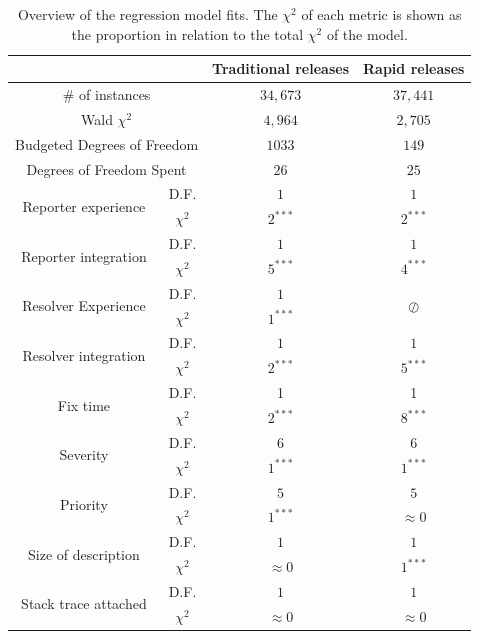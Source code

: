 \begin{sloppypar}
\begin{table}[t]
	\scriptsize
	\begin{center}
		\caption{Overview of the regression model fits. The $\chi^2$ of
		each metric is shown as the proportion in relation to the total
	$\chi^2$ of the model.  \label{tbl:regression_models} }
			\begin{tabular}{cccc}
			\cline{3-4} 
			\multicolumn{2}{c}{} & 
			Traditional releases &
			Rapid releases 
			\tabularnewline
			\hline 
			\multicolumn{2}{c}{\# of instances} & 
			$34,673$ &
			$37,441$  
			\tabularnewline
			\hline
			\multicolumn{2}{c}{Wald $\chi^2$} & 
			$4,964$ &
			$2,705$  
			\tabularnewline
			\hline 
			\multicolumn{2}{c}{Budgeted Degrees of Freedom} &
			$1033$ & 
			$149$ 
			\tabularnewline
			\hline
			\multicolumn{2}{c}{Degrees of Freedom Spent} &
			$26$ & 
			$25$ 
			\tabularnewline
			\hline 
			\multirow{2}{*}{Reporter experience} & 
			D.F. & 
			$1$ & 
			$1$  
			\tabularnewline 
			& 
			$\chi^2$ & 
			$2^{\ast\ast\ast}$ &  
			$2^{\ast\ast\ast}$ 
			\tabularnewline
			\hline 
			\multirow{2}{*}{Reporter integration} & 
			D.F. & 
			$1$ & 
			$1$  
			\tabularnewline 
			& 
			$\chi^2$ & 
			$5^{\ast\ast\ast}$ &  
			$4^{\ast\ast\ast}$ 
			\tabularnewline
			\hline 
			\multirow{2}{*}{Resolver Experience} & 
			D.F. & 
			$1$ & 
			\multirow{2}{*}{$\oslash$}
			\tabularnewline &
			$\chi^2$ & 
			$1^{\ast\ast\ast}$ &
			\tabularnewline 
			\hline 
			\multirow{2}{*}{Resolver integration} & 
			D.F. & 
			$1$ & 
			$1$  
			\tabularnewline 
			& 
			$\chi^2$ & 
			$2^{\ast\ast\ast}$ &  
			$5^{\ast\ast\ast}$ 
			\tabularnewline
			\hline 
			\multirow{2}{*}{Fix time} & 
			D.F. & 
			1 &
			1  
			\tabularnewline & 
			$\chi^2$ &
			$2^{\ast\ast\ast}$ &
			$8^{\ast\ast\ast}$ 
			\tabularnewline \hline 
			\multirow{2}{*}{Severity} &
			D.F. & 
			$6$ & 
			$6$ 
			\tabularnewline & 
			$\chi^2$ & 
			$1^{\ast\ast\ast}$ &  
			$1^{\ast\ast\ast}$  
			\tabularnewline \hline 
			\multirow{2}{*}{Priority} & 
			D.F. & 
			$5$ & 
			$5$ 
			\tabularnewline & 
			$\chi^2$ & 
			$1^{\ast\ast\ast}$ &  
			$\approx 0$   
			\tabularnewline \hline 
			\multirow{2}{*}{Size of description} & 
			D.F. & 
			$1$ &
			$1$  
			\tabularnewline & 
			$\chi^2$ & 
			$\approx 0$ &
			$1^{\ast\ast\ast}$   
			\tabularnewline \hline 
			\multirow{2}{*}{Stack trace attached} & 
			D.F. & 
			$1$ &
			$1$  
			\tabularnewline & 
			$\chi^2$ & 
			$\approx 0$ &  
			$\approx 0$ 
			\tabularnewline \hline 

\end{tabular}
\end{center}
\end{table}
\end{sloppypar}
